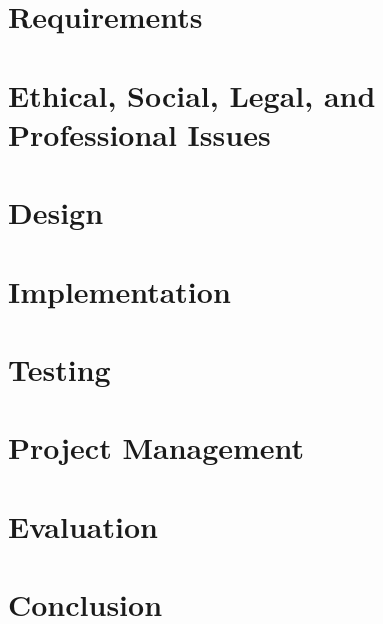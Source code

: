 \documentclass[
  12pt,
  a4paper,
  twoside,
  onecolumn,
  appendixprefix=true,
  toc=chapterentrywithdots,
  toc=bibliography,
  abstract=true,
  toc=listof
]{scrreprt}
\begin{document}
\chapter{Requirements}
\label{requirements}


\chapter{Ethical, Social, Legal, and Professional Issues}
\label{issues}


\chapter{Design}
\label{design}


\chapter{Implementation}
\label{implementation}


\chapter{Testing}
\label{testing}


\chapter{Project Management}
\label{project_management}


\chapter{Evaluation}
\label{evaluation}


\chapter{Conclusion}
\label{conclusion}






\appendix
\newpage
{}

\end{document}
